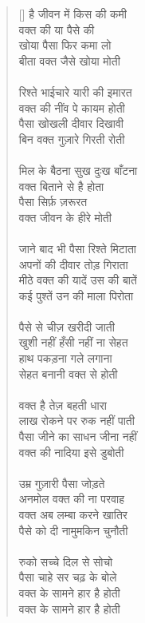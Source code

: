 \begin{verse}[\versewidth] \texthindi{
है जीवन में किस की कमी\\
वक्त की या पैसे की\\
खोया पैसा फिर कमा लो\\
बीता वक्त जैसे खोया मोती\\
\\
रिश्ते भाईचारे यारी की इमारत\\
वक्त की नींव पे कायम होती\\
पैसा खोखली दीवार दिखावी\\
बिन वक्त गुज़ारे गिरती रोती\\
\\
मिल के बैठना सुख दुःख बाँटना\\
वक्त बिताने से है होता\\
पैसा सिर्फ़ ज़रूरत\\
वक्त जीवन के हीरे मोती\\
\\
जाने बाद भी पैसा रिश्ते मिटाता\\
अपनों की दीवार तोड़ गिराता\\
मीठे वक्त की यादें उस की बातें\\
कई पुश्तें उन की माला पिरोता\\
\\
पैसे से चीज़ खरीदी जाती\\
खुशी नहीं हँसी नहीं ना सेहत\\
हाथ पकड़ना गले लगाना\\
सेहत बनानी वक्त से होती\\
\\
वक्त है तेज़ बहती धारा\\
लाख रोकने पर रुक नहीं पाती\\
पैसा जीने का साधन जीना नहीं\\
वक्त की नादिया इसे डुबोती\\
\\
उम्र गुज़ारी पैसा जोड़ते\\
अनमोल वक्त की ना परवाह\\
वक्त अब लम्बा करने खातिर\\
पैसे को दी नामुमकिन चुनौती\\
\\
रुको सच्चे दिल से सोचो\\
पैसा चाहे सर चढ़ के बोले\\
वक्त के सामने हार है होती\\
वक्त के सामने हार है होती
}
\end{verse}

